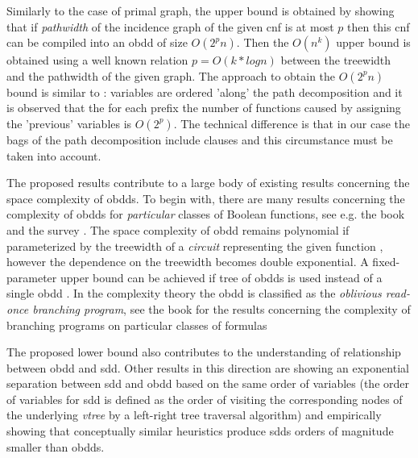 \documentclass{article}
\begin{document}
Similarly to the case of primal graph, the upper bound is obtained by showing that if \emph{pathwidth}
of the incidence graph of the given {\sc cnf} is at most $p$ then this {\sc cnf} can be compiled into 
an {\sc obdd} of size $O(2^pn)$. Then the $O(n^k)$ upper bound is obtained using a well known relation
$p=O(k*logn)$ between the treewidth and the pathwidth of the given graph. The approach to obtain the 
$O(2^pn)$ bound is similar to \cite{VardiTWD}: variables are ordered 'along' the path decomposition
and it is observed that the for each prefix the number of functions caused by assigning the 'previous'
variables is $O(2^p)$. The technical difference is that in our case the bags of the path decomposition
include clauses and this circumstance must be taken into account. 

The proposed results contribute to a large body of existing results concerning the space complexity
of {\sc obdd}s. To begin with, there are many results concerning the complexity of {\sc obdd}s for 
\emph{particular} classes of Boolean functions, see e.g. the book \cite{WegBook} and the survey \cite{WegSurvey}. 
The space complexity of {\sc obdd} remains polynomial if parameterized by the treewidth of a \emph{circuit} representing the given 
function \cite{OBDDTWJha}, however the dependence on the treewidth becomes double exponential. 
A fixed-parameter upper bound can be achieved if tree of {\sc obdd}s is used instead of a single
{\sc obdd} \cite{McMillan94,SubbaTree}. In the complexity theory the {\sc obdd} is classified
as the \emph{oblivious read-once branching program}, see the book \cite{Yukna} for the results concerning the
complexity of branching programs on particular classes of formulas

The proposed lower bound also contributes to the understanding of relationship between {\sc obdd}
and {\sc sdd}. Other results in this direction are \cite{SDDvsOBDD} showing an exponential separation
between {\sc sdd} and {\sc obdd} based on the same order of variables (the order of variables for
{\sc sdd} is defined as the order of visiting the corresponding nodes of the underlying \emph{vtree}
by a left-right tree traversal algorithm) and \cite{DynSDD} empirically showing that conceptually similar 
heuristics produce {\sc sdd}s orders of magnitude smaller than {\sc obdd}s. 
\end{document}
